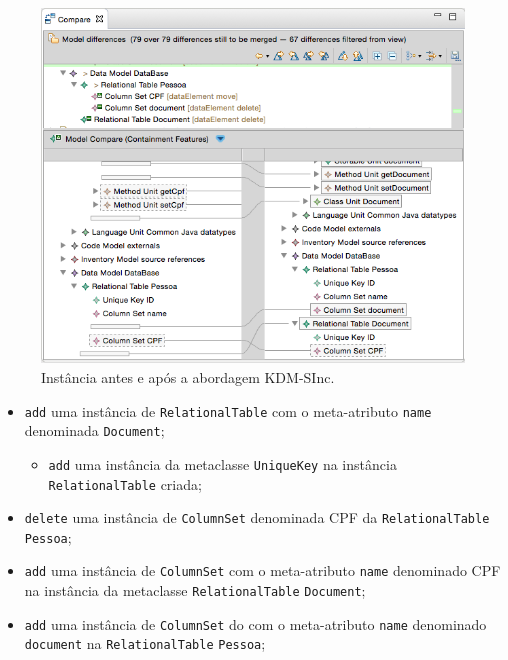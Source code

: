 \begin{figure}[!h]
	\centering
	\caption{Instância antes e após a abordagem KDM-SInc.}
	\label{fig:efeitoPropagacaoKDMSINC}
	\includegraphics[scale=0.6]{images/propagacaoKDMEfeito}
	\fautor
\end{figure}

\begin{itemize}
    \item \texttt{add} uma instância de \texttt{RelationalTable} com o meta-atributo \texttt{name} denominada \texttt{Document};
    
    \begin{itemize}
        \item \texttt{add} uma instância da metaclasse \texttt{UniqueKey} na instância \texttt{RelationalTable} criada;
    \end{itemize}
    
    \item \texttt{delete} uma instância de \texttt{ColumnSet} denominada CPF da \texttt{RelationalTable} \texttt{Pessoa};
    
    \item \texttt{add} uma instância de \texttt{ColumnSet} com o meta-atributo \texttt{name} denominado CPF na instância da metaclasse \texttt{RelationalTable} \texttt{Document};
    
    \item \texttt{add} uma instância de \texttt{ColumnSet} do com o meta-atributo \texttt{name} denominado \texttt{document} na \texttt{RelationalTable} \texttt{Pessoa};

    
\end{itemize}

